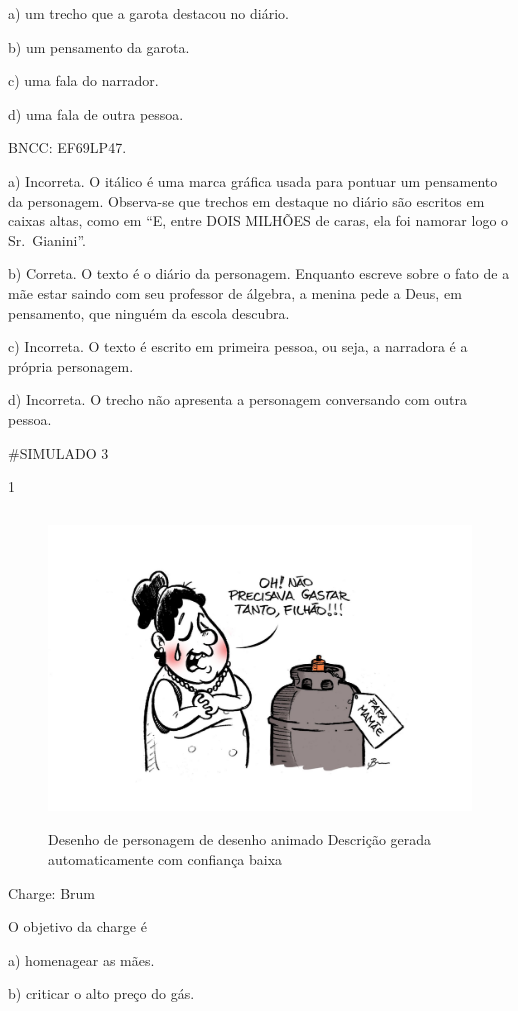 a) um trecho que a garota destacou no diário.

b) um pensamento da garota.

c) uma fala do narrador.

d) uma fala de outra pessoa.

BNCC: EF69LP47.

a) Incorreta. O itálico é uma marca gráfica usada para pontuar um
pensamento da personagem. Observa-se que trechos em destaque no diário
são escritos em caixas altas, como em ``E, entre DOIS MILHÕES de caras,
ela foi namorar logo o Sr.~Gianini''.

b) Correta. O texto é o diário da personagem. Enquanto escreve sobre o
fato de a mãe estar saindo com seu professor de álgebra, a menina pede a
Deus, em pensamento, que ninguém da escola descubra.

c) Incorreta. O texto é escrito em primeira pessoa, ou seja, a narradora
é a própria personagem.

d) Incorreta. O trecho não apresenta a personagem conversando com outra
pessoa.

\#SIMULADO 3

\num{1}

\begin{figure}
\centering
\includegraphics[width=4.86098in,height=3.28333in]{./imgSAEB_6_POR/media/image39.png}
\caption{Desenho de personagem de desenho animado Descrição gerada
automaticamente com confiança baixa}
\end{figure}

Charge: Brum

O objetivo da charge é

a) homenagear as mães.

b) criticar o alto preço do gás.

